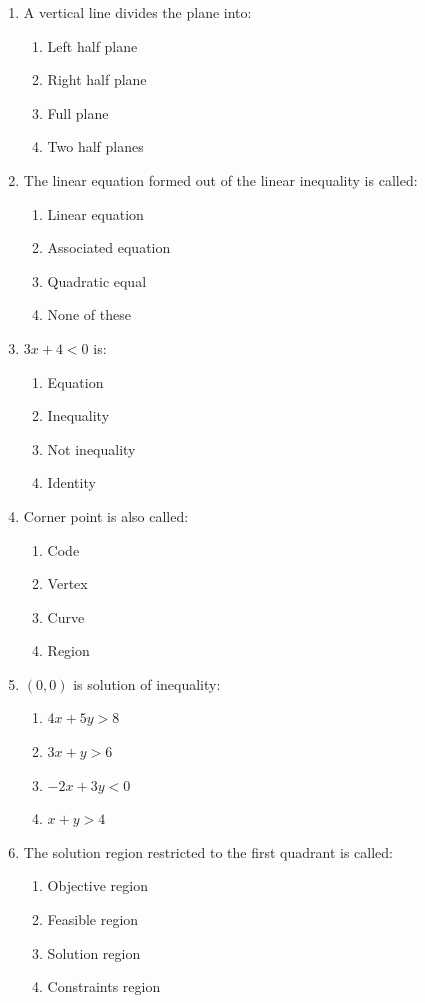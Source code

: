 \documentclass[11pt]{article}
\begin{document}
\begin{enumerate}[label=\textbf{\arabic*.}, start=204, leftmargin=2em]

\item A vertical line divides the plane into:
\begin{enumerate}[label=(\Alph*)] \item Left half plane \item Right half plane \item Full plane \item Two half planes \end{enumerate}

\item The linear equation formed out of the linear inequality is called:
\begin{enumerate}[label=(\Alph*)] \item Linear equation \item Associated equation \item Quadratic equal \item None of these \end{enumerate}

\item $3x + 4 < 0$ is:
\begin{enumerate}[label=(\Alph*)] \item Equation \item Inequality \item Not inequality \item Identity \end{enumerate}

\item Corner point is also called:
\begin{enumerate}[label=(\Alph*)] \item Code \item Vertex \item Curve \item Region \end{enumerate}

\item $(0,0)$ is solution of inequality:
\begin{enumerate}[label=(\Alph*)] \item $4x + 5y > 8$ \item $3x + y > 6$ \item $-2x + 3y < 0$ \item $x + y > 4$ \end{enumerate}

\item The solution region restricted to the first quadrant is called:
\begin{enumerate}[label=(\Alph*)] \item Objective region \item Feasible region \item Solution region \item Constraints region \end{enumerate}


\end{enumerate}
\end{document}
